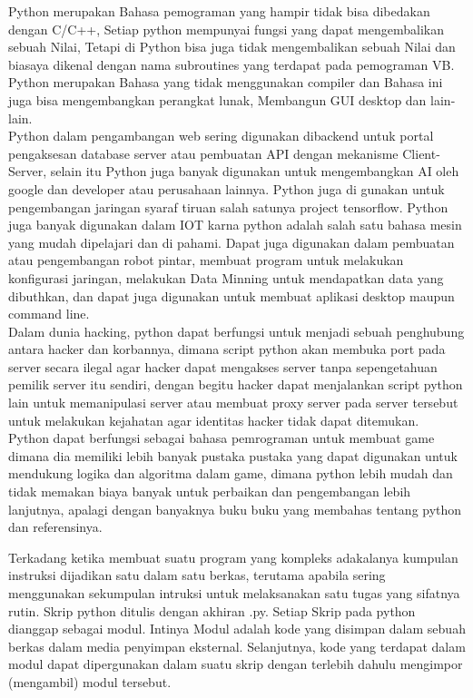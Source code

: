 \documentclass[12pt,a4paper]{article}
\begin{document}
Python merupakan Bahasa pemograman yang hampir tidak bisa dibedakan dengan C/C++, Setiap python mempunyai fungsi yang dapat mengembalikan sebuah Nilai, Tetapi di Python  bisa juga  tidak mengembalikan sebuah Nilai dan biasaya dikenal dengan nama subroutines yang terdapat pada pemograman VB. Python merupakan Bahasa yang tidak menggunakan compiler dan Bahasa ini juga bisa mengembangkan perangkat lunak, Membangun GUI desktop dan lain-lain.\\

Python dalam pengambangan web sering digunakan dibackend untuk portal pengaksesan database server atau pembuatan API dengan mekanisme Client-Server, selain itu Python juga banyak digunakan untuk mengembangkan AI oleh google dan developer atau perusahaan lainnya. Python juga di gunakan untuk pengembangan jaringan syaraf tiruan salah satunya project tensorflow. Python juga banyak digunakan dalam IOT karna python adalah salah satu bahasa mesin yang mudah dipelajari dan di pahami. Dapat juga digunakan dalam pembuatan atau pengembangan robot pintar, membuat program untuk melakukan konfigurasi jaringan, melakukan Data Minning untuk mendapatkan data yang dibuthkan, dan dapat juga digunakan untuk membuat aplikasi desktop maupun command line.\\

Dalam dunia hacking, python dapat berfungsi untuk menjadi sebuah penghubung antara hacker dan korbannya, dimana script python akan membuka port pada server secara ilegal agar hacker dapat mengakses server tanpa sepengetahuan pemilik server itu sendiri, dengan begitu hacker dapat menjalankan script python lain untuk memanipulasi server atau membuat proxy server pada server tersebut untuk melakukan kejahatan agar identitas hacker tidak dapat ditemukan.\\

Python dapat berfungsi sebagai bahasa pemrograman untuk membuat game dimana dia memiliki lebih banyak pustaka pustaka yang dapat digunakan untuk mendukung logika dan algoritma dalam game, dimana python lebih mudah dan tidak memakan biaya banyak untuk perbaikan dan pengembangan lebih lanjutnya, apalagi dengan banyaknya buku buku yang membahas tentang python dan referensinya.

Terkadang ketika membuat suatu program yang kompleks adakalanya kumpulan instruksi dijadikan satu dalam satu berkas, terutama apabila sering menggunakan sekumpulan intruksi untuk melaksanakan satu tugas yang sifatnya rutin. Skrip python ditulis dengan akhiran .py. Setiap Skrip pada python dianggap sebagai modul. Intinya Modul adalah kode yang disimpan dalam sebuah berkas dalam media penyimpan eksternal. Selanjutnya, kode yang terdapat dalam modul dapat dipergunakan dalam suatu skrip dengan terlebih dahulu mengimpor (mengambil) modul tersebut.\\
\end{document}
